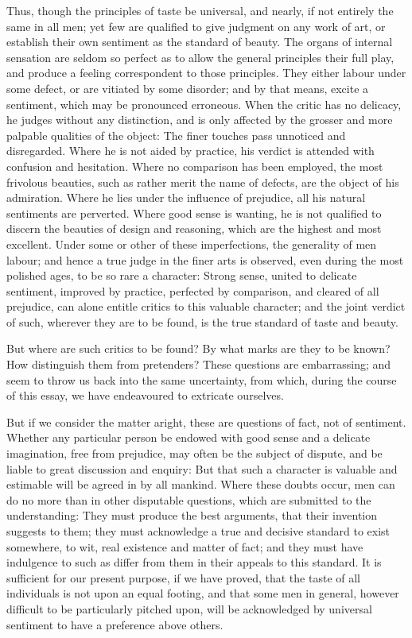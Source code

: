 Thus, though the principles of taste be universal, and nearly, if not
entirely the same in all men; yet few are qualified to give judgment
on any work of art, or establish their own sentiment as the standard
of beauty. The organs of internal sensation are seldom so perfect as
to allow the general principles their full play, and produce a feeling
correspondent to those principles. They either labour under some
defect, or are vitiated by some disorder; and by that means, excite a
sentiment, which may be pronounced erroneous. When the critic has no
delicacy, he judges without any distinction, and is only affected by
the grosser and more palpable qualities of the object: The finer
touches pass unnoticed and disregarded. Where he is not aided by
practice, his verdict is attended with confusion and hesitation. Where
no comparison has been employed, the most frivolous beauties, such as
rather merit the name of defects, are the object of his admiration.
Where he lies under the influence of prejudice, all his natural
sentiments are perverted. Where good sense is wanting, he is not
qualified to discern the beauties of design and reasoning, which are
the highest and most excellent. Under some or other of these
imperfections, the generality of men labour; and hence a true judge in
the finer arts is observed, even during the most polished ages, to be
so rare a character: Strong sense, united to delicate sentiment,
improved by practice, perfected by comparison, and cleared of all
prejudice, can alone entitle critics to this valuable character; and
the joint  verdict of such, wherever they are to be found,
is the true standard of taste and beauty.

But where are such critics to be found? By what marks are they to be
known? How distinguish them from pretenders? These questions are
embarrassing; and seem to throw us back into the same uncertainty,
from which, during the course of this essay, we have endeavoured to
extricate ourselves.

But if we consider the matter aright, these are questions of fact, not
of sentiment. Whether any particular person be endowed with good sense
and a delicate imagination, free from prejudice, may often be the
subject of dispute, and be liable to great discussion and enquiry: But
that such a character is valuable and estimable will be agreed in by
all mankind. Where these doubts occur, men can do no more than in
other disputable questions, which are submitted to the understanding:
They must produce the best arguments, that their invention suggests to
them; they must acknowledge a true and decisive standard to exist
somewhere, to wit, real existence and matter of fact; and they must
have indulgence to such as differ from them in their appeals to this
standard. It is sufficient for our present purpose, if we have proved,
that the taste of all individuals is not upon an equal footing, and
that some men in general, however difficult to be particularly pitched
upon, will be acknowledged by universal sentiment to have a preference
above others.

